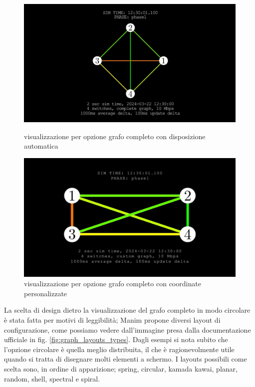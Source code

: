 \documentclass[binding=0.6cm]{sapthesis}
\begin{document}
\begin{figure}[h]
    \centering
    \begin{minipage}{0.46\textwidth}
      \includegraphics[width=\linewidth]{immagini/custom_complete_autopositioning.JPG}
      \caption{visualizzazione per opzione grafo completo con disposizione automatica}
      \label{fig:custom_complete_autopositioning}
    \end{minipage}\hfill
    \begin{minipage}{0.47\textwidth}
      \includegraphics[width=\linewidth]{immagini/custom_complete_manual_positioning.JPG}
      \caption{visualizzazione per opzione grafo completo con coordinate personalizzate}
      \label{fig:custom_complete_manual_positioning}
    \end{minipage}
\end{figure}


La scelta di design dietro la visualizzazione del grafo completo in modo circolare è stata fatta per motivi di leggibilità; Manim propone diversi
layout di configurazione, come possiamo vedere dall'immagine presa dalla documentazione ufficiale \cite{manimGraph} in fig. \ref{fig:graph_layouts_types}. Dagli esempi
si nota subito che l'opzione circolare è quella meglio distribuita, il che è ragionevolmente utile quando si tratta di disegnare molti elementi a schermo. 
I layouts possibili come scelta sono, in ordine di apparizione; spring, circular, kamada kawai, planar, random, shell, spectral e spiral.
\end{document}
